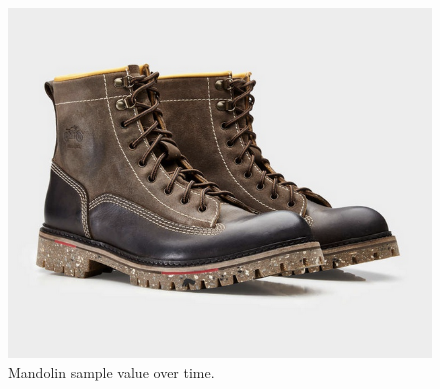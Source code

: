 \documentclass{article}
\begin{document}
        \begin{figure}[h]
            \includegraphics[scale=0.25]{images/placeholder.png}%
            \centering
            \caption{Mandolin sample value over time.}
            \label{specWaterfallMando1}
        \end{figure}
\end{document}
